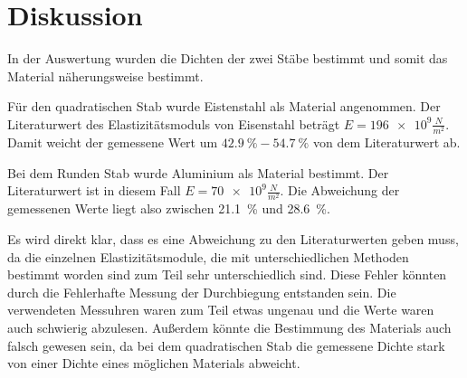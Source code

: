 \section{Diskussion}

In der Auswertung wurden die Dichten der zwei Stäbe bestimmt und somit das Material
näherungsweise bestimmt.

Für den quadratischen Stab wurde Eistenstahl als Material angenommen. Der Literaturwert
des Elastizitätsmoduls von Eisenstahl beträgt $E = \num{196e9} \frac{N}{m^2}$. Damit weicht der
gemessene Wert um $\SI{42.9}{\percent} - \SI{54.7}{\percent} $ von dem Literaturwert ab.

Bei dem Runden Stab wurde Aluminium als Material bestimmt. Der Literaturwert ist in diesem
Fall $E = \num{70e9} \frac{N}{m^2}$. Die Abweichung der gemessenen Werte liegt also zwischen
\SI{21.1}{\percent} und \SI{28.6}{\percent}.

Es wird direkt klar, dass es eine Abweichung zu den Literaturwerten geben muss, da
die einzelnen Elastizitätsmodule, die mit unterschiedlichen Methoden bestimmt worden
sind zum Teil sehr unterschiedlich sind.
Diese Fehler könnten durch die Fehlerhafte Messung der Durchbiegung entstanden sein.
Die verwendeten Messuhren waren zum Teil etwas ungenau und die Werte waren auch
schwierig abzulesen.
Außerdem könnte die Bestimmung des Materials auch falsch gewesen sein, da bei dem
quadratischen Stab die gemessene Dichte stark von einer Dichte eines möglichen Materials
abweicht.
